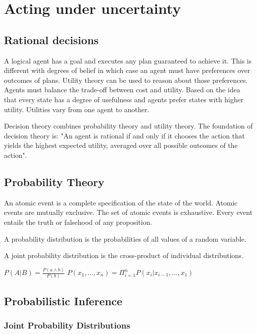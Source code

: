 \documentclass{article}
\begin{document}
\section{Acting under uncertainty}

\subsection{Rational decisions}

A logical agent has a goal and executes any plan guaranteed to achieve it. This is different with degrees of belief in which case an agent must have preferences over outcomes of plans. Utility theory can be used to reason about those preferences. Agents must balance the trade-off between cost and utility. Based on the idea that every state has a degree of usefulness and agents prefer states with higher utility. Utilities vary from one agent to another.

Decision theory combines probability theory and utility theory. The foundation of decision theory is: "An agent is rational if and only if it chooses the action that yields the highest expected utility, averaged over all possible outcomes of the action".

\subsection{Probability Theory}

An atomic event is a complete specification of the state of the world. Atomic events are mutually exclusive. The set of atomic events is exhaustive. Every event entails the truth or falsehood of any proposition. 

A probability distribution is the probabilities of all values of a random variable. 

A joint probability distribution is the cross-product of individual distributions.

$P(A|B) = \frac{P(a \wedge b)}{P(b)}$
$P(x_1, \ldots, x_n) = \Pi_{i=1}^n P(x_i | x_{i-1},\ldots, x_1)$

\subsection{Probabilistic Inference}

\subsubsection{Joint Probability Distributions}
\end{document}
